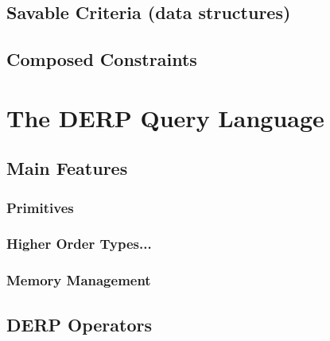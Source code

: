 \documentclass{article}
\begin{document}
\subsection{Savable Criteria (data structures)}
\subsection{Composed Constraints}

\section{The DERP Query Language}
\subsection{Main Features}
\subsubsection{Primitives}
\subsubsection{Higher Order Types...}
\subsubsection{Memory Management}
\subsection{DERP Operators}
\end{document}
